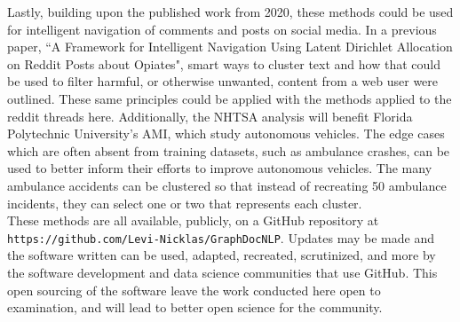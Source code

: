 Lastly, building upon the published work from 2020, these methods could be used for intelligent navigation of comments and posts on social media. In a previous paper, ``A Framework for Intelligent Navigation Using Latent Dirichlet Allocation on Reddit Posts about Opiates", smart ways to cluster text and how that could be used to filter harmful, or otherwise unwanted, content from a web user were outlined. These same principles could be applied with the methods applied to the reddit threads here. Additionally, the NHTSA analysis will benefit Florida Polytechnic University's AMI, which study autonomous vehicles. The edge cases which are often absent from training datasets, such as ambulance crashes, can be used to better inform their efforts to improve autonomous vehicles. The many ambulance accidents can be clustered so that instead of recreating 50 ambulance incidents, they can select one or two that represents each cluster. \\
These methods are all available, publicly, on a GitHub repository at \texttt{https://github.com/Levi-Nicklas/GraphDocNLP}. Updates may be made and the software written can be used, adapted, recreated, scrutinized, and more by the software development and data science communities that use GitHub. This open sourcing of the software leave the work conducted here open to examination, and will lead to better open science for the community.

\nocite{vishwanathan2010graph}
\nocite{kriege2020survey}
\nocite{nikolentzos2017shortest}
\nocite{kondor2002diffusion}
\nocite{vazirgiannis2018graphrep}
\nocite{cheng2006n}
\nocite{rosenfeld2020kernel}
\nocite{akioyamen2020framework}
\nocite{wickham2019welcome}
\nocite{sugiyama2018graphkernels}
\nocite{sugiyama2015halting}
\nocite{csardi2013package}
\nocite{csardi2006igraph}
\nocite{silge2016tidytext}
\nocite{rivera2015package}
\nocite{wickham2010stringr}
\nocite{bengtsson2020unifying}







